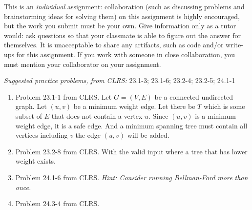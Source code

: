\documentclass[letterpaper,11pt]{article}
\begin{document}


This is an \emph{individual} assignment: collaboration (such as discussing problems and brainstorming ideas for solving them) on this assignment is highly encouraged, but the work you submit must be your own. Give information only as a tutor would: ask questions so that your classmate is able to figure out the answer for themselves. It is unacceptable to share any artifacts, such as code and/or write-ups for this assignment. If you work with someone in close collaboration, you must mention your collaborator on your assignment.

\emph{Suggested practice problems, from CLRS:} 23.1-3; 23.1-6; 23.2-4; 23.2-5; 24.1-1

\begin{enumerate}
\item Problem 23.1-1 from CLRS.
Let $G = (V,E)$ be a connected undirected graph. Let $(u,v)$ be a minimum weight edge. Let there be $T$ which is some subset of $E$ that does not contain a vertex $u$. Since $(u,v)$ is a minimum weight edge, it is a safe edge. And a minimum spanning tree must contain all vertices including $v$ the edge $(u,v)$ will be added.
\item Problem 23.2-8 from CLRS.
With the valid input where a tree that has lower weight exists.
\item Problem 24.1-6 from CLRS. \emph{Hint: Consider running Bellman-Ford more than once.}
\item Problem 24.3-4 from CLRS.

\end{enumerate}
\end{document}
